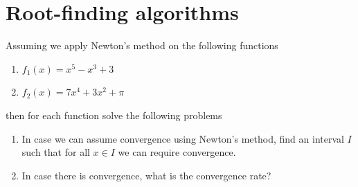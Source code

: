 \documentclass[11pt, a4paper]{article}
\begin{document}

\newpage
\section{Root-finding algorithms}

\begin{exercise}
  Assuming we apply Newton's method on the following functions
  \begin{enumerate}
    \item[(a)] $f_1(x) = x^5 - x^3 + 3$
    \item[(b)] $f_2(x) = 7x^4 + 3x^2 + \pi$
  \end{enumerate}
  then for each function solve the following problems
  \begin{enumerate}
    \item[(1)] In case we can assume convergence using Newton's
      method, find an interval $I$ such that for all $x \in I$
      we can require convergence.
    \item[(2)] In case there is convergence, what is the convergence rate?
  \end{enumerate}
\end{exercise}
\end{document}
